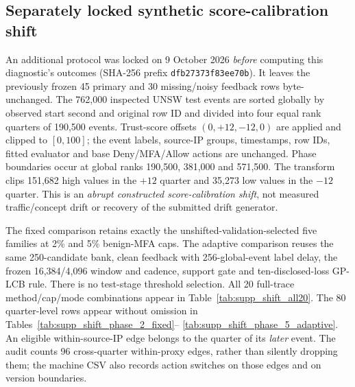 \documentclass[10pt,onecolumn]{IEEEtran}
\begin{document}
\subsection{Separately locked synthetic score-calibration shift}
\label{sec:supp_score_shift}
An additional protocol was locked on 9 October 2026
\emph{before} computing this diagnostic's outcomes
(SHA-256 prefix \texttt{dfb27373f83ee70b}).
It leaves the previously frozen 45 primary and
30 missing/noisy feedback rows byte-unchanged.
The 762,000 inspected UNSW test events are sorted
globally by observed start second and original row
ID and divided into four equal rank quarters of
190,500 events. Trust-score offsets
\((0,+12,-12,0)\) are applied and clipped to
\([0,100]\); the event labels, source-IP groups,
timestamps, row IDs, fitted evaluator and base
Deny/MFA/Allow actions are unchanged. Phase
boundaries occur at global ranks
190,500, 381,000 and 571,500. The transform
clips 151,682 high values in the \(+12\) quarter
and 35,273 low values in the \(-12\) quarter.
This is an \emph{abrupt constructed score-calibration
shift}, not measured traffic/concept drift or
recovery of the submitted drift generator.

The fixed comparison retains exactly the
unshifted-validation-selected five families at
2\% and 5\% benign-MFA caps. The adaptive
comparison reuses the same 250-candidate bank,
clean feedback with 256-global-event label delay,
the frozen 16,384/4,096 window and cadence,
support gate and ten-disclosed-loss GP-LCB rule.
There is no test-stage threshold selection.
All 20 full-trace method/cap/mode combinations
appear in Table~\ref{tab:supp_shift_all20}.
The 80 quarter-level rows appear without
omission in
Tables~\ref{tab:supp_shift_phase_2_fixed}--
\ref{tab:supp_shift_phase_5_adaptive}.
An eligible within-source-IP edge belongs to
the quarter of its \emph{later} event. The
audit counts 96 cross-quarter within-proxy
edges, rather than silently dropping them;
the machine CSV also records action switches
on those edges and on version boundaries.
\end{document}
